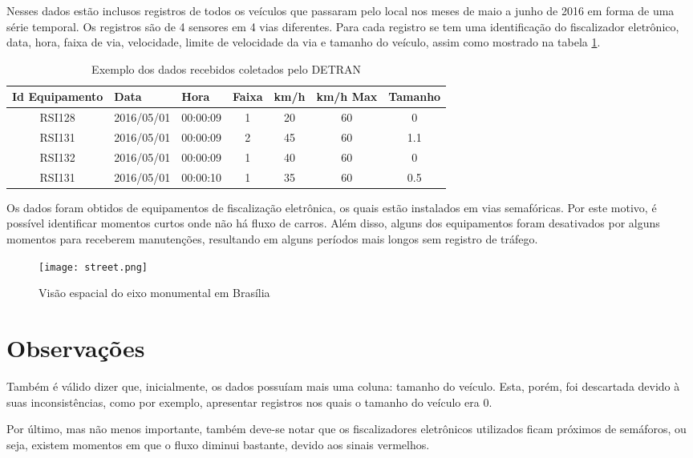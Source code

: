 Nesses dados estão inclusos registros de todos os veículos que passaram pelo local nos meses de maio a junho de 2016 em forma de uma série temporal. Os registros são de 4 sensores em 4 vias diferentes. Para cada registro se tem uma identificação do fiscalizador eletrônico, data, hora, faixa de via, velocidade, limite de velocidade da via e tamanho do veículo, assim como mostrado na tabela \ref{table:data}.

\begin{table}[h]
    \begin{tabular}{ccccccc}
    \toprule
    \multicolumn{1}{l}{\textbf{Id Equipamento}} & \multicolumn{1}{l}{\textbf{Data}} & \multicolumn{1}{l}{\textbf{Hora}} & \multicolumn{1}{l}{\textbf{Faixa}} & \multicolumn{1}{l}{\textbf{km/h}} & \multicolumn{1}{l}{\textbf{km/h Max}} & \multicolumn{1}{l}{\textbf{Tamanho}} \\ 
    \midrule
    RSI128 & 2016/05/01 & 00:00:09 & 1 & 20 & 60 & 0 \\
    RSI131 & 2016/05/01 & 00:00:09 & 2 & 45 & 60 & 1.1 \\
    RSI132 & 2016/05/01 & 00:00:09 & 1 & 40 & 60 & 0 \\
    RSI131 & 2016/05/01 & 00:00:10 & 1 & 35 & 60 & 0.5 \\ 
    \bottomrule
    \end{tabular}
    \label{table:data}
    \caption{Exemplo dos dados recebidos coletados pelo \acrshort{DETRAN}}
\end{table}

Os dados foram obtidos de equipamentos de fiscalização eletrônica, os quais estão instalados em vias semafóricas. Por este motivo, é possível identificar momentos curtos onde não há fluxo de carros. Além disso, alguns dos equipamentos foram desativados por alguns momentos para receberem manutenções, resultando em alguns períodos mais longos sem registro de tráfego.

\begin{figure}[t]
    \centering
    \texttt{[image: street.png]}
    \label{figure:eixo}
    \caption{Visão espacial do eixo monumental em Brasília}
\end{figure}


\section{Observações}


Também é válido dizer que, inicialmente, os dados possuíam mais uma coluna: tamanho do veículo. Esta, porém, foi descartada devido à suas inconsistências, como por exemplo, apresentar registros nos quais o tamanho do veículo era 0.

Por último, mas não menos importante, também deve-se notar que os fiscalizadores eletrônicos utilizados ficam próximos de semáforos, ou seja, existem momentos em que o fluxo diminui bastante, devido aos sinais vermelhos. 